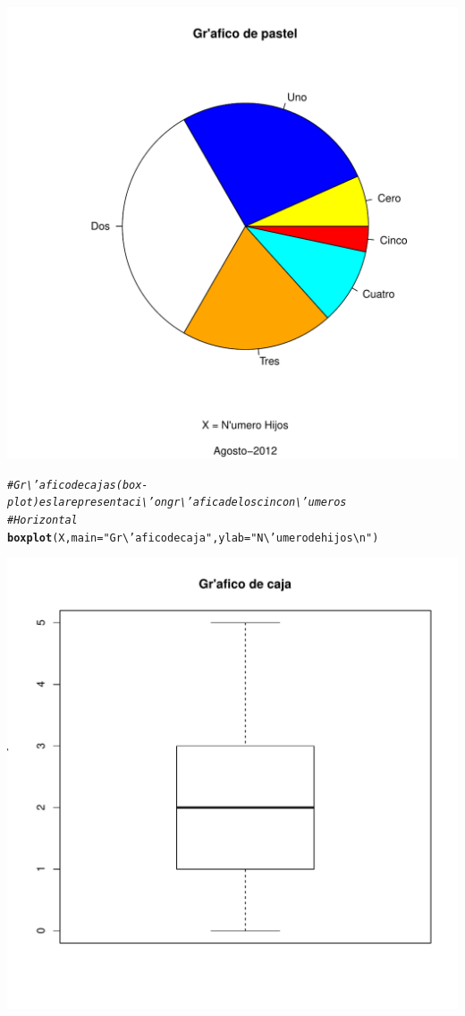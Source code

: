 \documentclass[12pt,letterpaper]{article}\usepackage[]{graphicx}\usepackage[]{color}
\makeatletter
\def\maxwidth{ %
  \ifdim\Gin@nat@width>\linewidth
    \linewidth
  \else
    \Gin@nat@width
  \fi
}
\newcommand{\hlstr}[1]{\textcolor[rgb]{0.192,0.494,0.8}{#1}}%
\newcommand{\hlcom}[1]{\textcolor[rgb]{0.678,0.584,0.686}{\textit{#1}}}%
\newcommand{\hlstd}[1]{\textcolor[rgb]{0.345,0.345,0.345}{#1}}%
\newcommand{\hlkwc}[1]{\textcolor[rgb]{0.333,0.667,0.333}{#1}}%
\newcommand{\hlkwd}[1]{\textcolor[rgb]{0.737,0.353,0.396}{\textbf{#1}}}%
\newenvironment{kframe}{%
 \def\at@end@of@kframe{}%
 \ifinner\ifhmode%
  \def\at@end@of@kframe{\end{minipage}}%
  \begin{minipage}{\columnwidth}%
 \fi\fi%
 \def\FrameCommand##1{\hskip\@totalleftmargin \hskip-\fboxsep
 \colorbox{shadecolor}{##1}\hskip-\fboxsep
     \hskip-\linewidth \hskip-\@totalleftmargin \hskip\columnwidth}%
 \MakeFramed {\advance\hsize-\width
   \@totalleftmargin\z@ \linewidth\hsize
   \@setminipage}}%
 {\par\unskip\endMakeFramed%
 \at@end@of@kframe}
\newenvironment{knitrout}{}{} %
\makeatother
\begin{document}
\begin {itemize}
\begin{knitrout}
\includegraphics[width=\maxwidth]{figure/unnamed-chunk-9-3} 
\begin{kframe}\begin{alltt}
\hlcom{# Gr\textbackslash{}'afico de cajas (box-plot) es la representaci\textbackslash{}'on gr\textbackslash{}'afica de los cinco n\textbackslash{}'umeros}
\hlcom{# Horizontal}
\hlkwd{boxplot}\hlstd{(X,} \hlkwc{main}\hlstd{=}\hlstr{"Gr\textbackslash{}'afico de caja"}\hlstd{,} \hlkwc{ylab}\hlstd{=}\hlstr{"N\textbackslash{}'umero de hijos\textbackslash{}n"}\hlstd{)}
\end{alltt}
\end{kframe}
\includegraphics[width=\maxwidth]{figure/unnamed-chunk-9-4} 

\end{knitrout}
\end{itemize}
\end{document}
